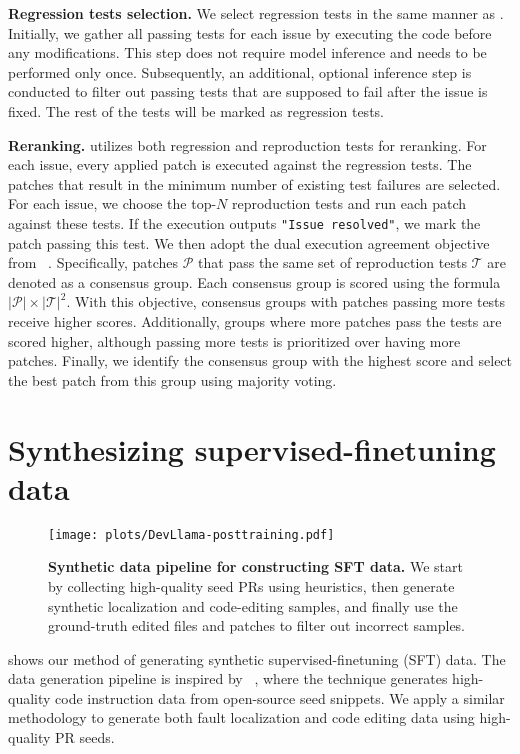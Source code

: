 \textbf{Regression tests selection.}
We select regression tests in the same manner as \agentless. Initially, we gather all passing tests for each issue by executing the code before any modifications. This step does not require model inference and needs to be performed only once.
Subsequently, an additional, optional inference step is conducted to filter out passing tests that are supposed to fail after the issue is fixed.
The rest of the tests will be marked as regression tests.

\textbf{Reranking.}
\ouragentless utilizes both regression and reproduction tests for reranking.
For each issue, every applied patch is executed against the regression tests. The patches that result in the minimum number of existing test failures are selected.
For each issue, we choose the top-$N$ reproduction tests and run each patch against these tests. If the execution outputs \texttt{"Issue resolved"}, we mark the patch passing this test.
We then adopt the dual execution agreement objective from \codet~\cite{codet}.
Specifically, patches $\mathcal P$ that pass the same set of reproduction tests $\mathcal T$ are denoted as a consensus group. Each consensus group is scored using the formula 
$|\mathcal P|\times|\mathcal T|^2$.
With this objective, consensus groups with patches passing more tests receive higher scores. Additionally, groups where more patches pass the tests are scored higher, although passing more tests is prioritized over having more patches.
Finally, we identify the consensus group with the highest score and select the best patch from this group using majority voting.


\section{Synthesizing supervised-finetuning data}
\label{sec:apd:posttraining}

\begin{figure}[htbp]
\centering
\texttt{[image: plots/DevLlama-posttraining.pdf]}
\caption{\textbf{Synthetic data pipeline for constructing SFT data.}
We start by collecting high-quality seed PRs using heuristics, then generate synthetic localization and code-editing samples, and finally use the ground-truth edited files and patches to filter out incorrect samples.}
\label{fig:posttraining}
\end{figure}

 shows our method of generating synthetic supervised-finetuning (SFT) data.
The data generation pipeline is inspired by \magicoder~\cite{magicoder}, where the \ossinstruct technique generates high-quality code instruction data from open-source seed snippets.
We apply a similar methodology to generate both fault localization and code editing data using high-quality PR seeds.


